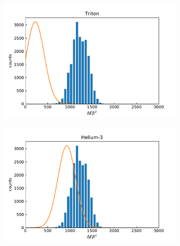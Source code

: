 \begin{figure}[ht]
	\begin{subfigure}[c]{0.45\textwidth}
		\centering
		\includegraphics[width=\textwidth]{dat/debeta_Triton.pdf}
	\end{subfigure}
	\begin{subfigure}[c]{0.45\textwidth}
		\centering
		\includegraphics[width=\textwidth]{dat/debeta_Helium-3.pdf}
	\end{subfigure}
	

\end{figure}
